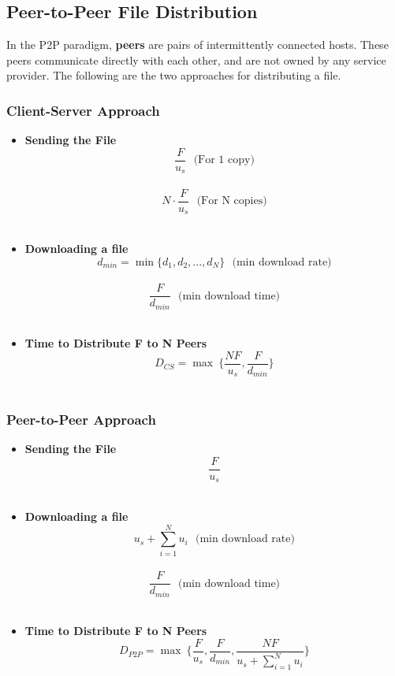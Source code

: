 \documentclass{article}
\begin{document}
\subsection{Peer-to-Peer File Distribution}
In the P2P paradigm, \textbf{peers} are pairs of intermittently connected hosts. These peers communicate directly with each other, and are not owned by any service provider. The following are the two approaches for distributing a file.

\subsubsection{Client-Server Approach}
\begin{itemize}
	\item \textbf{Sending the File} \\
		\[ \displaystyle\frac{F}{u_s}~~~\text{(For 1 copy)} \] \\
		\[ \displaystyle N \cdot \frac{F}{u_s}~~~\text{(For N copies)} \] \
	
	\item \textbf{Downloading a file} \\
		\[ \displaystyle d_{min} = \min{\{d_1, d_2, ..., d_N\}}~~~\text{(min download rate)} \] \\
		\[ \displaystyle \frac{F}{d_{min}}~~~\text{(min download time)} \] \
	
	\item \textbf{Time to Distribute F to N Peers} \\
		\[ \displaystyle D_{CS} = \max{\ \Bigg\{\frac{NF}{u_s} , \frac{F}{d_{min}} \Bigg\}} \] \
\end{itemize}

\subsubsection{Peer-to-Peer Approach}
\begin{itemize}
	\item \textbf{Sending the File} \\
		\[ \displaystyle\frac{F}{u_s} \] \
	
	\item \textbf{Downloading a file} \\
		\[ \displaystyle u_s + \sum^{N}_{i = 1} u_i~~~\text{(min download rate)} \] \\
		\[ \displaystyle \frac{F}{d_{min}}~~~\text{(min download time)} \] \
	
	\item \textbf{Time to Distribute F to N Peers} \\
		\[ \displaystyle D_{P2P} = \max{\ \Bigg\{\frac{F}{u_s} , \frac{F}{d_{min}}, \frac{NF}{u_s + \sum^{N}_{i = 1} u_i} \Bigg\}} \] \
\end{itemize} \
\end{document}
